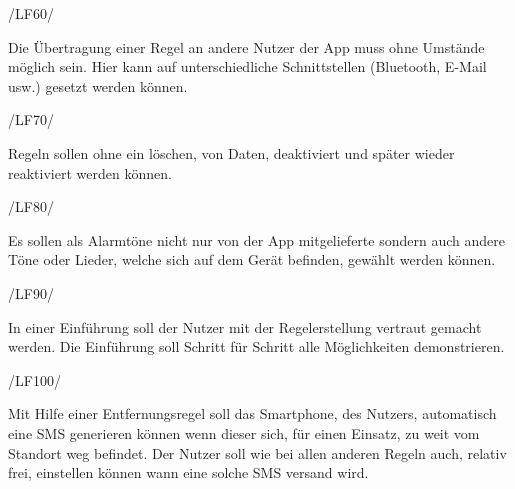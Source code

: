 \begin{minipage}{3cm}
/LF60/
\end{minipage}
\begin{minipage}{13cm}
Die \"Ubertragung einer Regel an andere Nutzer der App muss ohne Umst\"ande m\"oglich sein. Hier kann auf unterschiedliche Schnittstellen (Bluetooth, E-Mail usw.) gesetzt werden k\"onnen. \\
\end{minipage}
\begin{minipage}{3cm}
/LF70/
\end{minipage}
\begin{minipage}{13cm}
Regeln sollen ohne ein l\"oschen, von Daten, deaktiviert und sp\"ater wieder reaktiviert werden k\"onnen.\\
\end{minipage}
\begin{minipage}{3cm}
/LF80/
\end{minipage}
\begin{minipage}{13cm}
Es sollen als Alarmt\"one nicht nur von der App mitgelieferte sondern auch andere T\"one oder Lieder, welche sich auf dem Ger\"at befinden, gew\"ahlt werden k\"onnen.\\
\end{minipage}
\begin{minipage}{3cm}
/LF90/
\end{minipage}
\begin{minipage}{13cm}
In einer Einf\"uhrung soll der Nutzer mit der Regelerstellung vertraut gemacht werden. Die Einf\"uhrung soll Schritt f\"ur Schritt alle M\"oglichkeiten demonstrieren.\\
\end{minipage}
\begin{minipage}{3cm}
/LF100/
\end{minipage}
\begin{minipage}{13cm}
Mit Hilfe einer Entfernungsregel soll das Smartphone, des Nutzers, automatisch eine SMS generieren k\"onnen wenn dieser sich, f\"ur einen Einsatz, zu weit vom Standort weg befindet.
Der Nutzer soll wie bei allen anderen Regeln auch, relativ frei, einstellen k\"onnen wann eine solche SMS versand wird.
\end{minipage}

